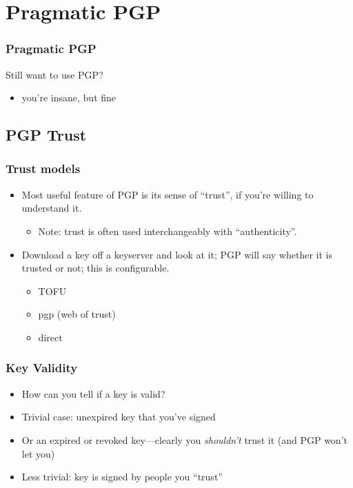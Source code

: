 \documentclass[aspectratio=1610,bigger,utf8]{beamer}
\begin{document}
\section{Pragmatic PGP}

\begin{frame}
	\frametitle{Pragmatic PGP}
	Still want to use PGP? 
	\begin{itemize}
		\item you're insane, but fine
	\end{itemize}
\end{frame}

\subsection{PGP Trust}
\begin{frame}
	\frametitle{Trust models}
	\begin{itemize}
		\item Most useful feature of PGP is its sense of ``trust'', if
			you're willing to understand it.
			\begin{itemize}
				\item \alert{Note:} trust is often used
					interchangeably with ``authenticity''.
			\end{itemize}
		\item Download a key off a keyserver and look at it; PGP will
			say whether it is trusted or not; this is configurable.
			\begin{itemize}
				\item TOFU
				\item pgp (web of trust)
				\item direct
			\end{itemize}
	\end{itemize}
\end{frame}
\begin{frame}
	\frametitle{Key Validity}
	\begin{itemize}
		\item How can you tell if a key is valid?\pause
		\item Trivial case: unexpired key that you've signed
		\item Or an expired or revoked key---clearly you \emph{shouldn't} trust
				it (and PGP won't let you)\pause
		\item Less trivial: key is signed by people you ``trust''
	\end{itemize}
\end{frame}
\end{document}

